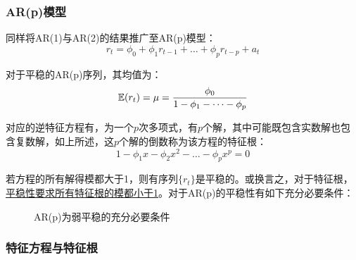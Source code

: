 \documentclass[11pt]{article}
\begin{document}
\subsubsection*{AR(p)模型}

同样将AR(1)与AR(2)的结果推广至AR(p)模型：
\begin{equation*}
    r_t = \phi_0 + \phi_1 r_{t-1} + \dots + \phi_p r_{t-p} + a_t
\end{equation*}

对于平稳的AR(p)序列，其均值为：
\begin{equation*}
    \mathbb{E}(r_t) = \mu = \frac{\phi_0}{1 - \phi_1 - \dots - \phi_p}
\end{equation*}

对应的逆特征方程有，为一个$p$次多项式，有$p$个解，其中可能既包含实数解也包含复数解，如上所述，这$p$个解的倒数称为该方程的特征根：
\begin{equation*}
    1 - \phi_1 x - \phi_2 x^2 - \dots - \phi_p x^p= 0
\end{equation*}

若方程的所有解得模都大于1，则有序列$\{r_t\}$是平稳的。或换言之，对于特征根，\uline{平稳性要求所有特征根的模都小于1}。对于AR(p)的平稳性有如下充分必要条件：
\begin{figure}[H]
\centering
\caption{AR(p)为弱平稳的充分必要条件}
\end{figure}

\subsubsection*{特征方程与特征根}
\end{document}
